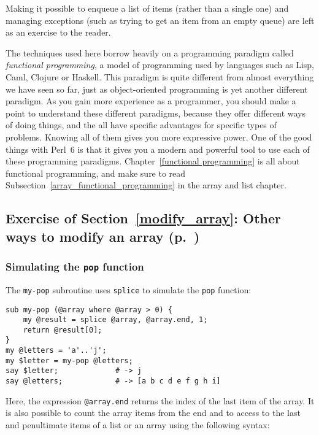 Making it possible to enqueue a list of items (rather 
than a single one) and managing exceptions (such as 
trying to get an item from an empty queue) are left 
as an exercise to the reader.

The techniques used here borrow heavily on a programming 
paradigm called \emph{functional programming}, a model of 
programming used by languages such as Lisp, Caml, Clojure or 
Haskell. This paradigm is quite different from almost 
everything we have seen so far, just as object-oriented 
programming is yet another different paradigm. As you gain 
more experience as a programmer, you should make a point 
to understand these different paradigms, because they offer 
different ways of doing things, and the all have specific 
advantages for specific types of problems. Knowing all of them 
gives you more expressive power. One of the good things with 
Perl~6 is that it gives you a modern and powerful tool to use 
each of these programming paradigms. 
Chapter~\ref{functional programming} is all about functional 
programming, and make sure to read 
Subsection~\ref{array_functional_programming} in the 
array and list chapter.

\subsection{Exercise of Section~\ref{modify_array}: Other ways to modify an array (p.~\pageref{splice_exercise})}
\label{sol_splice_exercise}

\subsubsection{Simulating the {\tt pop} function}

The {\tt my-pop} subroutine uses {\tt splice} to simulate 
the {\tt pop} function:  

\begin{verbatim}
sub my-pop (@array where @array > 0) {
    my @result = splice @array, @array.end, 1;
    return @result[0];
}
my @letters = 'a'..'j';
my $letter = my-pop @letters;
say $letter;             # -> j
say @letters;            # -> [a b c d e f g h i]
\end{verbatim}

Here, the expression \verb'@array.end' returns the index of 
the last item of the array. It is also possible to count 
the array items from the end and to access to the last and 
penultimate items of a list or an array using the following 
syntax:

